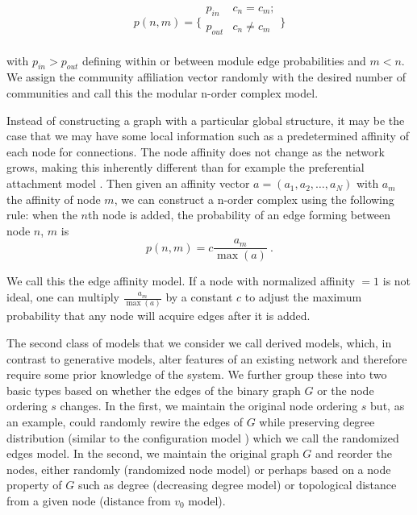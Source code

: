 \documentclass{article}
\begin{document}
\begin{equation}
p(n,m) = \Big\{ \begin{array}{ll}
p_{in} & c_n = c_m; \\
p_{out} & c_n \neq c_m \\
\end{array}
\Big\}
\end{equation}

with $p_{in} > p_{out}$ defining within or between module edge probabilities and $m < n$. We assign the community affiliation vector randomly with the desired number of communities and call this the modular n-order complex model.

Instead of constructing a graph with a particular global structure, it may be the case that we may have some local information such as a predetermined affinity of each node for connections. The node affinity does not change as the network grows, making this inherently different than for example the preferential attachment model \cite{barabasi1999emergence}. Then given an affinity vector $a = (a_1, a_2, \dots, a_N)$ with $a_m$ the affinity of node $m$, we can construct a n-order complex using the following rule: when the $n$th node is added, the probability of an edge forming between node $n$, $m$ is
\begin{equation}
p(n,m) = c\frac{a_m}{\max(a)} \mathrm{~.}
\end{equation}

We call this the edge affinity model. If a node with normalized affinity $=1$ is not ideal, one can multiply $\frac{a_m}{\max(a)}$ by a constant $c$ to adjust the maximum probability that any node will acquire edges after it is added.

The second class of models that we consider we call derived models, which, in contrast to generative models, alter features of an existing network and therefore require some prior knowledge of the system. We further group these into two basic types based on whether the edges of the binary graph $G$ or the node ordering $s$ changes. In the first, we maintain the original node ordering $s$ but, as an example, could randomly rewire the edges of $G$ while preserving degree distribution (similar to the configuration model \cite{bender1978asymptotic,maslov2002specificity}) which we call the randomized edges model. In the second, we maintain the original graph $G$ and reorder the nodes, either randomly (randomized node model) or perhaps based on a node property of $G$ such as degree (decreasing degree model) or topological distance from a given node (distance from $v_0$ model).
\end{document}
